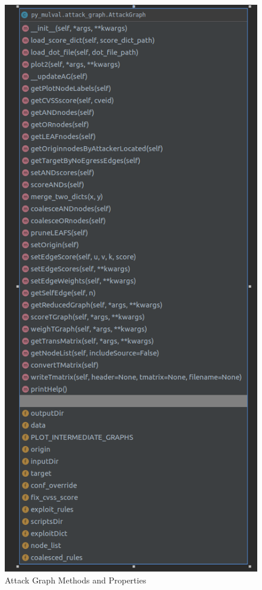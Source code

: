 \begin{figure}[H]
\centering
\includegraphics[scale=.45]{resource/img/ch_automation/attack_graph_class_diag.png}
\caption{Attack Graph Methods and Properties}
\label{fig:automation:ag_details_uml}
\end{figure}

